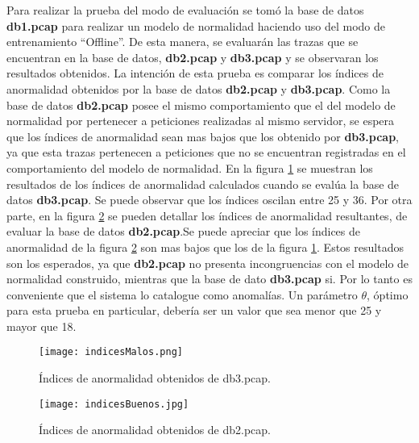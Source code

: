 Para realizar la prueba del modo de evaluación se tomó la base de datos
\textbf{db1.pcap} para realizar un modelo de normalidad haciendo uso del modo de entrenamiento ``Offline''. De esta manera, se evaluarán las trazas que se encuentran en la base de datos, \textbf{db2.pcap} y \textbf{db3.pcap} y se observaran los resultados obtenidos.
La intención de esta prueba es comparar los  índices de anormalidad
obtenidos por la base de datos \textbf{db2.pcap} y \textbf{db3.pcap}.
Como la base de datos \textbf{db2.pcap} posee el mismo comportamiento que
el del modelo de normalidad por pertenecer a peticiones realizadas al mismo servidor, se espera que los  índices de anormalidad sean mas bajos que los obtenido por \textbf{db3.pcap}, ya que esta trazas pertenecen a peticiones que no se encuentran registradas en el comportamiento del modelo de normalidad.
En la figura \ref{fig:indicesMalos} se muestran los resultados de los  índices de anormalidad calculados cuando se evalúa la base de datos \textbf{db3.pcap}.
Se puede observar que los índices oscilan entre 25 y 36.
Por otra parte, en la figura \ref{fig:indicesBuenos} se pueden detallar los índices de anormalidad resultantes, de evaluar la base de datos \textbf{db2.pcap}.Se puede apreciar que los índices de anormalidad de la figura \ref{fig:indicesBuenos} son mas bajos que los de la figura \ref{fig:indicesMalos}. Estos resultados son los esperados, ya que \textbf{db2.pcap} no presenta incongruencias con el modelo de normalidad construido, mientras que la base de dato \textbf{db3.pcap} si. Por lo tanto es conveniente que el sistema lo catalogue como anomalías.
Un parámetro $\theta$, óptimo para esta prueba en particular, debería ser un
valor que sea menor que 25 y mayor que 18.

\begin{figure}[tb]
\begin{center}
\texttt{[image: indicesMalos.png]}
\caption{Índices de anormalidad obtenidos de db3.pcap.}
\label{fig:indicesMalos}
\end{center}
\end{figure}

\begin{figure}[tb]
\begin{center}
\texttt{[image: indicesBuenos.jpg]}
\caption{Índices de anormalidad obtenidos de db2.pcap.}
\label{fig:indicesBuenos}
\end{center}
\end{figure}
